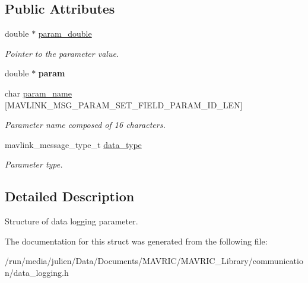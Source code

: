 \subsection*{Public Attributes}
\begin{DoxyCompactItemize}
\item 
\hypertarget{structdata__logging__entry__t_a6050f33013d509f022d8a383a8e3d1c2}{double $\ast$ \hyperlink{structdata__logging__entry__t_a6050f33013d509f022d8a383a8e3d1c2}{param\+\_\+double}}\label{structdata__logging__entry__t_a6050f33013d509f022d8a383a8e3d1c2}

\begin{DoxyCompactList}\small\item\em Pointer to the parameter value. \end{DoxyCompactList}\item 
\hypertarget{structdata__logging__entry__t_a9c020fe9632d688e2ea4be23c8751158}{double $\ast$ {\bfseries param}}\label{structdata__logging__entry__t_a9c020fe9632d688e2ea4be23c8751158}

\item 
\hypertarget{structdata__logging__entry__t_af3bd8c8635809afd7e588898b28225cc}{char \hyperlink{structdata__logging__entry__t_af3bd8c8635809afd7e588898b28225cc}{param\+\_\+name} \mbox{[}M\+A\+V\+L\+I\+N\+K\+\_\+\+M\+S\+G\+\_\+\+P\+A\+R\+A\+M\+\_\+\+S\+E\+T\+\_\+\+F\+I\+E\+L\+D\+\_\+\+P\+A\+R\+A\+M\+\_\+\+I\+D\+\_\+\+L\+E\+N\mbox{]}}\label{structdata__logging__entry__t_af3bd8c8635809afd7e588898b28225cc}

\begin{DoxyCompactList}\small\item\em Parameter name composed of 16 characters. \end{DoxyCompactList}\item 
\hypertarget{structdata__logging__entry__t_a8ddadf69538bd965cdb0b12d97633270}{mavlink\+\_\+message\+\_\+type\+\_\+t \hyperlink{structdata__logging__entry__t_a8ddadf69538bd965cdb0b12d97633270}{data\+\_\+type}}\label{structdata__logging__entry__t_a8ddadf69538bd965cdb0b12d97633270}

\begin{DoxyCompactList}\small\item\em Parameter type. \end{DoxyCompactList}\end{DoxyCompactItemize}


\subsection{Detailed Description}
Structure of data logging parameter. 

The documentation for this struct was generated from the following file\+:\begin{DoxyCompactItemize}
\item 
/run/media/julien/\+Data/\+Documents/\+M\+A\+V\+R\+I\+C/\+M\+A\+V\+R\+I\+C\+\_\+\+Library/communication/data\+\_\+logging.\+h\end{DoxyCompactItemize}
